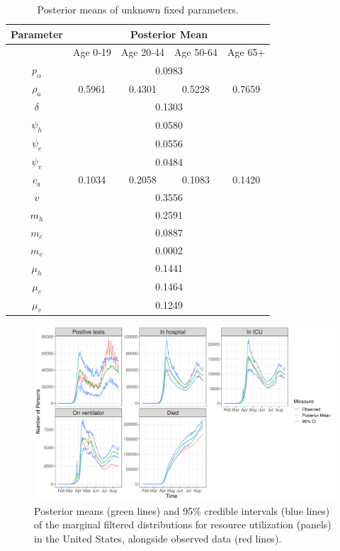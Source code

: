 \documentclass{article}
\begin{document}
\begin{table}
\begin{center}
\begin{tabular}{|c|cccc|}
\hline
Parameter & \multicolumn{4}{|c|}{Posterior Mean} \\
\hline
& Age 0-19 & Age 20-44 & Age 50-64 & Age 65+ \\
\hline
$p_\alpha$ & \multicolumn{4}{|c|}{0.0983} \\
$\rho_a$ & 0.5961 & 0.4301 & 0.5228 & 0.7659 \\
$\delta$ & \multicolumn{4}{|c|}{0.1303} \\
$\psi_h$ & \multicolumn{4}{|c|}{0.0580} \\
$\psi_c$ & \multicolumn{4}{|c|}{0.0556} \\
$\psi_v$ & \multicolumn{4}{|c|}{0.0484} \\
$c_a$ & 0.1034 & 0.2058 & 0.1083 & 0.1420 \\
$v$ & \multicolumn{4}{|c|}{0.3556} \\
$m_h$ & \multicolumn{4}{|c|}{0.2591} \\
$m_c$ & \multicolumn{4}{|c|}{0.0887} \\
$m_v$ & \multicolumn{4}{|c|}{0.0002} \\
$\mu_h$ & \multicolumn{4}{|c|}{0.1441} \\
$\mu_c$ & \multicolumn{4}{|c|}{0.1464} \\
$\mu_v$ & \multicolumn{4}{|c|}{0.1249} \\
\hline
\end{tabular}
\caption{Posterior means of unknown fixed parameters.}
\label{tab:postparam}
\end{center}
\end{table}

\begin{figure}
\centering
\includegraphics[width=1.0\textwidth]{figures/covid_pf_US_500000_ResourceObserved-2020-08-25}
\caption{Posterior means (green lines) and 95\% credible intervals (blue lines) of the marginal filtered distributions for resource utilization (panels) in the United States, alongside observed data (red lines).} \label{fig:filtresourceUS}
\end{figure}
\end{document}
